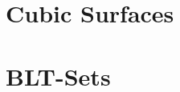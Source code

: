 \section{Cubic Surfaces}
\label{sec:mathematical:data:cubic:surfaces}






\bigskip

\clearpage


\section{BLT-Sets}
\label{sec:mathematical:data:BLT}






\bigskip

\clearpage



